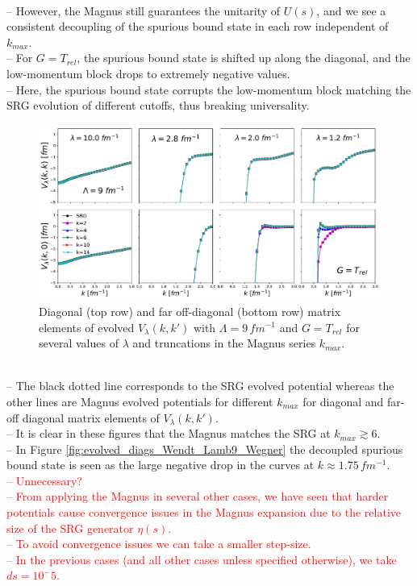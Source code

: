 \documentclass[preprintnumbers,floatfix,aps,prc,preprint,nofootinbib]{revtex4-1}
\begin{document}
\\
-- However, the Magnus still guarantees the unitarity of $U(s)$, and we see a consistent decoupling of the spurious bound state in each row independent of $k_{max}$.
\\
-- For $G=T_{rel}$, the spurious bound state is shifted up along the diagonal, and the low-momentum block drops to extremely negative values.
\\
-- Here, the spurious bound state corrupts the low-momentum block matching the SRG evolution of different cutoffs, thus breaking universality.
\\
%
\begin{figure}
  \captionsetup{singlelinecheck=false,justification=raggedright}
  \centering
  \includegraphics[width=14cm]{evolved_diags_Wendt_Lamb9_T}
  \hspace*{0.05\textwidth}
  \caption{Diagonal (top row) and far off-diagonal (bottom row) matrix elements of evolved $V_{\lambda}(k,k')$ with $\Lambda=9 \, fm^{-1}$ and $G=T_{rel}$ for several values of $\lambda$ and truncations in the Magnus series $k_{max}$.}
  \label{fig:evolved_diags_Wendt_Lamb9_T}
\end{figure}
%
\\
-- The black dotted line corresponds to the SRG evolved potential whereas the other lines are Magnus evolved potentials for different $k_{max}$ for diagonal and far-off diagonal matrix elements of $V_{\lambda}(k,k')$.
\\
-- It is clear in these figures that the Magnus matches the SRG at $k_{max} \gtrsim 6$.
\\
-- In Figure \ref{fig:evolved_diags_Wendt_Lamb9_Wegner} the decoupled spurious bound state is seen as the large negative drop in the curves at $k \approx 1.75 \, fm^{-1}$.
\\
\textcolor{red}{-- Unnecessary?
\\
-- From applying the Magnus in several other cases, we have seen that harder potentials cause convergence issues in the Magnus expansion due to the relative size of the SRG generator $\eta(s)$.
\\
-- To avoid convergence issues we can take a smaller step-size.
\\
-- In the previous cases (and all other cases unless specified otherwise), we take $ds=10^-5$.}
\\
\end{document}
